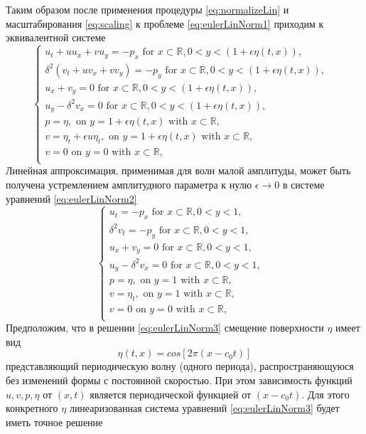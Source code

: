 Таким образом после применения процедуры \eqref{eq:normalizeLin} и масштабирования \eqref{eq:scaling} к проблеме \eqref{eq:eulerLinNorm1} приходим к эквивалентной системе
\begin{equation}\label{eq:eulerLinNorm2}
    \begin{cases}
         u_t + uu_x + vu_y = -p_x\text{ for } x\subset\mathbb{R}, 0<y<(1 + \epsilon\eta(t, x)), & \\
         \delta^2(v_t + uv_x + vv_y ) = -p_y \text{ for } x\subset\mathbb{R}, 0<y<(1 + \epsilon\eta(t, x)), & \\
         u_x + v_y = 0\text{ for }x\subset\mathbb{R}, 0<y<(1 + \epsilon\eta(t, x)), & \\
         u_y - \delta^2v_x = 0 \text{ for } x\subset\mathbb{R}, 0<y<(1 + \epsilon\eta(t, x)), & \\
         p = \eta,   \text{ on } y=1+\epsilon\eta(t, x) \text{ with } x\subset\mathbb{R}, & \\
         v = \eta_t+\epsilon u\eta_t, \text{ on } y=1+\epsilon\eta(t, x) \text{ with } x\subset\mathbb{R}, & \\
         v = 0 \text{ on } y = 0 \text{ with } x\subset\mathbb{R}, & \\
    \end{cases}
  \end{equation}
Линейная аппроксимация, применимая для волн малой амплитуды, может быть получена устремлением амплитудного параметра к нулю  $\epsilon\rightarrow 0$ в системе уравнений \eqref{eq:eulerLinNorm2}
\begin{equation}\label{eq:eulerLinNorm3}
    \begin{cases}
         u_t = -p_x\text{ for } x\subset\mathbb{R}, 0<y<1, & \\
         \delta^2v_t = -p_y \text{ for } x\subset\mathbb{R}, 0<y<1, & \\
         u_x + v_y = 0\text{ for }x\subset\mathbb{R}, 0<y<1, & \\
         u_y - \delta^2v_x = 0 \text{ for } x\subset\mathbb{R}, 0<y<1, & \\
         p = \eta,   \text{ on } y=1 \text{ with } x\subset\mathbb{R}, & \\
         v = \eta_t, \text{ on } y=1 \text{ with } x\subset\mathbb{R}, & \\
         v = 0 \text{ on } y = 0 \text{ with } x\subset\mathbb{R}, & \\
    \end{cases}
  \end{equation}
Предположим, что в решении \eqref{eq:eulerLinNorm3} смещение поверхности $\eta$ имеет вид
\begin{equation}\label{eq:ansatzLin}
  \eta(t,x)=cos[2\pi(x-c_0t)]
\end{equation}
представляющий периодическую волну (одного периода), распространяющуюся без изменений формы с постоянной скоростью. При этом зависимость функций $u,v,p,\eta$ от $(x,t)$ является периодической функцией от $(x-c_0t)$. Для этого конкретного $\eta$ линеаризованная система уравнений \eqref{eq:eulerLinNorm3} будет иметь точное решение

